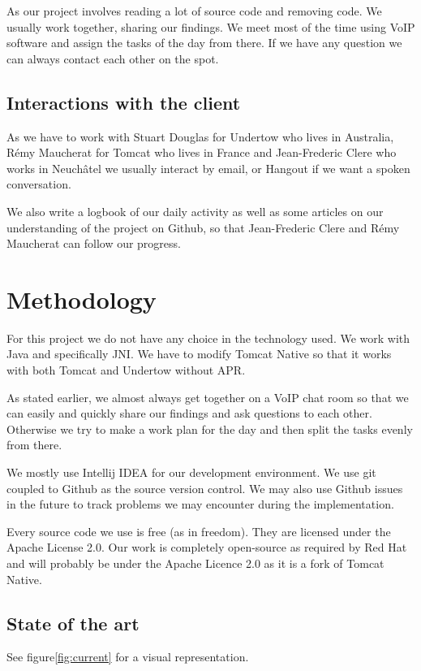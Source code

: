 \documentclass[11pt,a4paper,bibliography=totocnumbered]{scrartcl}
\begin{document}
As our project involves reading a lot of source code and removing code. We usually work together, sharing our findings. We meet most of the time using VoIP software and assign the tasks of the day from there. If we have any question we can always contact each other on the spot.

\subsection{Interactions with the client}

As we have to work with Stuart Douglas for Undertow who lives in Australia, Rémy Maucherat for Tomcat who lives in France and Jean-Frederic Clere who works in Neuchâtel we usually interact by email, or Hangout if we want a spoken conversation. 

We also write a logbook of our daily activity as well as some articles on our understanding of the project on Github, so that Jean-Frederic Clere and Rémy Maucherat can follow our progress.

\section{Methodology}

For this project we do not have any choice in the technology used. We work with Java and specifically JNI. We have to modify Tomcat Native so that it works with both Tomcat and Undertow without APR.

As stated earlier, we almost always get together on a VoIP chat room so that we can easily and quickly share our findings and ask questions to each other. Otherwise we try to make a work plan for the day and then split the tasks evenly from there.

We mostly use Intellij IDEA for our development environment. We use git coupled to Github as the source version control. We may also use Github issues in the future to track problems we may encounter during the implementation.

Every source code we use is free (as in freedom). They are licensed under the Apache License 2.0. Our work is completely open-source as required by Red Hat and will probably be under the Apache Licence 2.0 as it is a fork of Tomcat Native.
\subsection{State of the art}

See figure\ref{fig:current} for a visual representation.
\end{document}
